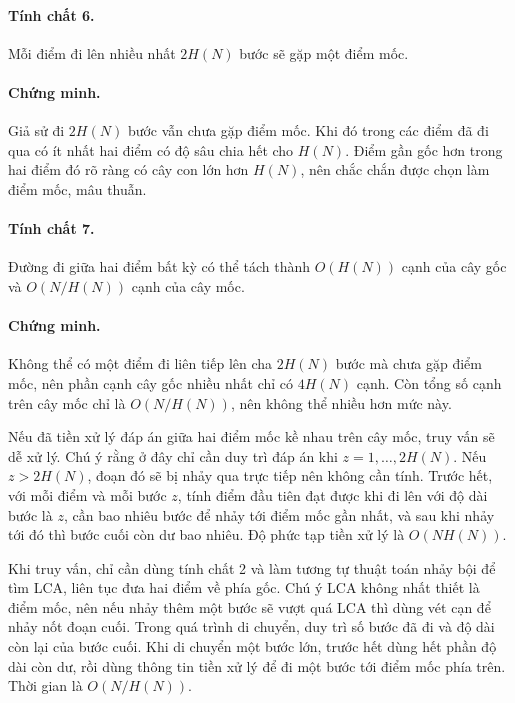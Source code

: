 \documentclass[11pt]{article}
\begin{document}
\paragraph{Tính chất 6.}
Mỗi điểm đi lên nhiều nhất \(2H(N)\) bước sẽ gặp một điểm mốc.

\paragraph{Chứng minh.}
Giả sử đi \(2H(N)\) bước vẫn chưa gặp điểm mốc. Khi đó trong các điểm đã đi qua
có ít nhất hai điểm có độ sâu chia hết cho \(H(N)\). Điểm gần gốc hơn trong hai
điểm đó rõ ràng có cây con lớn hơn \(H(N)\), nên chắc chắn được chọn làm điểm
mốc, mâu thuẫn.

\paragraph{Tính chất 7.}
Đường đi giữa hai điểm bất kỳ có thể tách thành \(O(H(N))\) cạnh của cây gốc và
\(O(N/H(N))\) cạnh của cây mốc.

\paragraph{Chứng minh.}
Không thể có một điểm đi liên tiếp lên cha \(2H(N)\) bước mà chưa gặp điểm mốc,
nên phần cạnh cây gốc nhiều nhất chỉ có \(4H(N)\) cạnh. Còn tổng số cạnh trên
cây mốc chỉ là \(O(N/H(N))\), nên không thể nhiều hơn mức này.

Nếu đã tiền xử lý đáp án giữa hai điểm mốc kề nhau trên cây mốc, truy vấn sẽ dễ
xử lý. Chú ý rằng ở đây chỉ cần duy trì đáp án khi \(z=1,\ldots,2H(N)\). Nếu
\(z>2H(N)\), đoạn đó sẽ bị nhảy qua trực tiếp nên không cần tính. Trước hết,
với mỗi điểm và mỗi bước \(z\), tính điểm đầu tiên đạt được khi đi lên với độ
dài bước là \(z\), cần bao nhiêu bước để nhảy tới điểm mốc gần nhất, và sau khi
nhảy tới đó thì bước cuối còn dư bao nhiêu. Độ phức tạp tiền xử lý là
\(O(NH(N))\).

Khi truy vấn, chỉ cần dùng tính chất 2 và làm tương tự thuật toán nhảy bội để
tìm LCA, liên tục đưa hai điểm về phía gốc. Chú ý LCA không nhất thiết là điểm
mốc, nên nếu nhảy thêm một bước sẽ vượt quá LCA thì dùng vét cạn để nhảy nốt
đoạn cuối. Trong quá trình di chuyển, duy trì số bước đã đi và độ dài còn lại
của bước cuối. Khi di chuyển một bước lớn, trước hết dùng hết phần độ dài còn
dư, rồi dùng thông tin tiền xử lý để đi một bước tới điểm mốc phía trên. Thời
gian là \(O(N/H(N))\).
\end{document}
